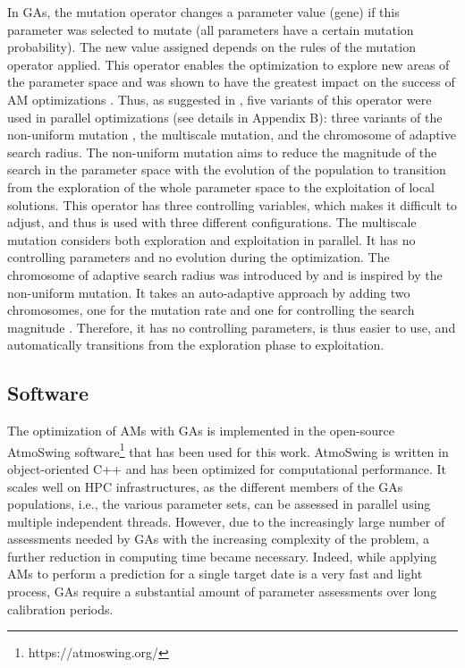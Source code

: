 \documentclass[draft]{agujournal2019}
\begin{document}
In GAs, the mutation operator changes a parameter value (gene) if this parameter was selected to mutate (all parameters have a certain mutation probability). The new value assigned depends on the rules of the mutation operator applied. This operator enables the optimization to explore new areas of the parameter space and was shown to have the greatest impact on the success of AM optimizations \cite{Horton2017a}. Thus, as suggested in , five variants of this operator were used in parallel optimizations (see details in Appendix B): three variants of the non-uniform mutation \cite{Michalewicz1996}, the multiscale mutation, and the chromosome of adaptive search radius. The non-uniform mutation aims to reduce the magnitude of the search in the parameter space with the evolution of the population to transition from the exploration of the whole parameter space to the exploitation of local solutions. This operator has three controlling variables, which makes it difficult to adjust, and thus is used with three different configurations. The multiscale mutation considers both exploration and exploitation in parallel. It has no controlling parameters and no evolution during the optimization. The chromosome of adaptive search radius was introduced by  and is inspired by the non-uniform mutation. It takes an auto-adaptive approach by adding two chromosomes, one for the mutation rate and one for controlling the search magnitude \cite<see details in>{Horton2017a}. Therefore, it has no controlling parameters, is thus easier to use, and automatically transitions from the exploration phase to exploitation.


\subsection{Software}
\label{software}

The optimization of AMs with GAs is implemented in the open-source AtmoSwing software\footnote{https://atmoswing.org/} \cite{Horton2019} that has been used for this work. AtmoSwing is written in object-oriented C++ and has been optimized for computational performance. It scales well on HPC infrastructures, as the different members of the GAs populations, i.e., the various parameter sets, can be assessed in parallel using multiple independent threads. However, due to the increasingly large number of assessments needed by GAs with the increasing complexity of the problem, a further reduction in computing time became necessary. Indeed, while applying AMs to perform a prediction for a single target date is a very fast and light process, GAs require a substantial amount of parameter assessments over long calibration periods.
\end{document}
